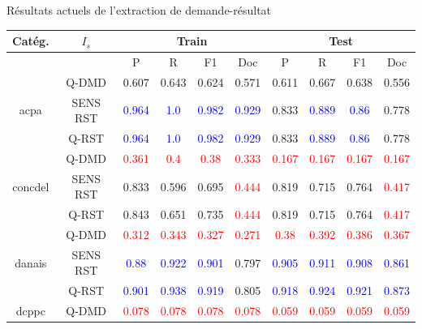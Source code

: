 \documentclass[newPxFont,pagenumber]{beamer}
\begin{document}
\begin{frame}{Résultats actuels de l'extraction de demande-résultat}
\begin{center}
\tiny
\begin{tabular}{|c||c||c|c|c|c||c|c|c|c|}
\hline
Catég. & $I_s$ & \multicolumn{4}{c||}{Train} & \multicolumn{4}{c|}{Test} \\ \hline
 & &  P & R & F1 & Doc & P & R & F1 & Doc  \\ \hline
 \multirow{3}{*}{acpa} & Q-DMD & 0.607 & 0.643 & 0.624 & 0.571 & 0.611 & 0.667 & 0.638 & 0.556  \\
 & SENS RST & \textcolor{blue}{0.964} & \textcolor{blue}{1.0} & \textcolor{blue}{0.982} & \textcolor{blue}{0.929} & 0.833 & \textcolor{blue}{0.889} & \textcolor{blue}{0.86} & 0.778  \\
 & Q-RST & \textcolor{blue}{0.964} & \textcolor{blue}{1.0} & \textcolor{blue}{0.982} & \textcolor{blue}{0.929}  & 0.833 & \textcolor{blue}{0.889} & \textcolor{blue}{0.86} & 0.778   \\\hline
\multirow{3}{*}{concdel} & Q-DMD & \textcolor{red}{0.361} & \textcolor{red}{0.4} & \textcolor{red}{0.38} & \textcolor{red}{0.333} & \textcolor{red}{0.167} & \textcolor{red}{0.167} & \textcolor{red}{0.167} & \textcolor{red}{0.167} \\
 & SENS RST & 0.833 & 0.596 & 0.695 & \textcolor{red}{0.444} & 0.819 & 0.715 & 0.764 & \textcolor{red}{0.417}  \\
 & Q-RST & 0.843 & 0.651 & 0.735 & \textcolor{red}{0.444} & 0.819 & 0.715 & 0.764 & \textcolor{red}{0.417}   \\ \hline
\multirow{3}{*}{danais} & Q-DMD & \textcolor{red}{0.312} & \textcolor{red}{0.343} & \textcolor{red}{0.327} & \textcolor{red}{0.271}  & \textcolor{red}{0.38} & \textcolor{red}{0.392} & \textcolor{red}{0.386} & \textcolor{red}{0.367} \\
 & SENS RST & \textcolor{blue}{0.88} & \textcolor{blue}{0.922} & \textcolor{blue}{0.901} & 0.797 &  \textcolor{blue}{0.905} & \textcolor{blue}{0.911} & \textcolor{blue}{0.908} & \textcolor{blue}{0.861} \\
 & Q-RST & \textcolor{blue}{0.901} & \textcolor{blue}{0.938} & \textcolor{blue}{0.919} & 0.805 & \textcolor{blue}{0.918} & \textcolor{blue}{0.924} & \textcolor{blue}{0.921} & \textcolor{blue}{0.873} \\ \hline
 \multirow{3}{*}{dcppc} & Q-DMD & \textcolor{red}{0.078} & \textcolor{red}{0.078} & \textcolor{red}{0.078} & \textcolor{red}{0.078} &  \textcolor{red}{0.059} & \textcolor{red}{0.059} & \textcolor{red}{0.059} & \textcolor{red}{0.059}  \\

\end{tabular}
\end{center}
\end{frame}
\end{document}
